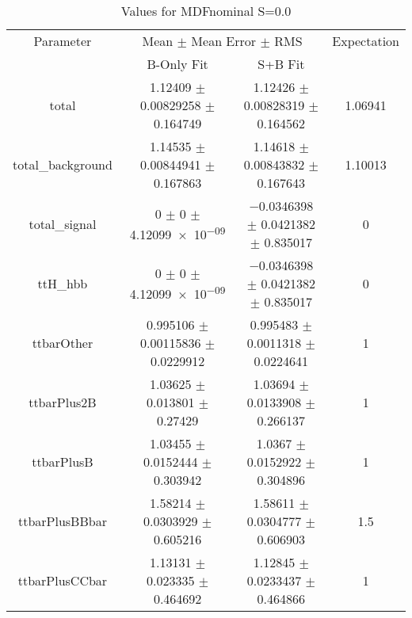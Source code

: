 \begin{table}
\centering
\caption{Values for MDFnominal S=0.0}
\begin{tabular}{cccc}
\toprule
Parameter & \multicolumn{2}{c}{Mean $\pm$ Mean Error $\pm$ RMS} & Expectation\\
 & B-Only Fit & S+B Fit & \\
\midrule
total & \num{1.12409} $\pm$ \num{0.00829258} $\pm$ \num{0.164749} & \num{1.12426} $\pm$ \num{0.00828319} $\pm$ \num{0.164562} & \num{1.06941}\\
total\_background & \num{1.14535} $\pm$ \num{0.00844941} $\pm$ \num{0.167863} & \num{1.14618} $\pm$ \num{0.00843832} $\pm$ \num{0.167643} & \num{1.10013}\\
total\_signal & \num{0} $\pm$ \num{0} $\pm$ \num{4.12099e-09} & \num{-0.0346398} $\pm$ \num{0.0421382} $\pm$ \num{0.835017} & \num{0}\\
ttH\_hbb & \num{0} $\pm$ \num{0} $\pm$ \num{4.12099e-09} & \num{-0.0346398} $\pm$ \num{0.0421382} $\pm$ \num{0.835017} & \num{0}\\
ttbarOther & \num{0.995106} $\pm$ \num{0.00115836} $\pm$ \num{0.0229912} & \num{0.995483} $\pm$ \num{0.0011318} $\pm$ \num{0.0224641} & \num{1}\\
ttbarPlus2B & \num{1.03625} $\pm$ \num{0.013801} $\pm$ \num{0.27429} & \num{1.03694} $\pm$ \num{0.0133908} $\pm$ \num{0.266137} & \num{1}\\
ttbarPlusB & \num{1.03455} $\pm$ \num{0.0152444} $\pm$ \num{0.303942} & \num{1.0367} $\pm$ \num{0.0152922} $\pm$ \num{0.304896} & \num{1}\\
ttbarPlusBBbar & \num{1.58214} $\pm$ \num{0.0303929} $\pm$ \num{0.605216} & \num{1.58611} $\pm$ \num{0.0304777} $\pm$ \num{0.606903} & \num{1.5}\\
ttbarPlusCCbar & \num{1.13131} $\pm$ \num{0.023335} $\pm$ \num{0.464692} & \num{1.12845} $\pm$ \num{0.0233437} $\pm$ \num{0.464866} & \num{1}\\
\bottomrule
\end{tabular}
\end{table}